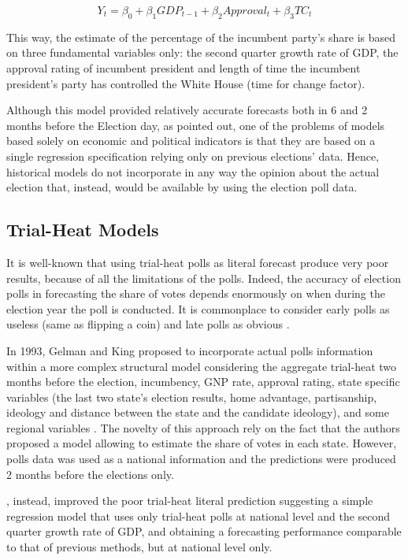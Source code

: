 \documentclass[
  12pt]{article}
\begin{document}
\[ Y_t = \beta_0 + \beta_1 GDP_{t-1} + \beta_2 Approval_t + \beta_3 TC_t \]

This way, the estimate of the percentage of the incumbent party's share
is based on three fundamental variables only: the second quarter growth
rate of GDP, the approval rating of incumbent president and length of
time the incumbent president's party has controlled the White House
(time for change factor).

Although this model provided relatively accurate forecasts both in 6 and
2 months before the Election day, as \citet{gel:kin:1993} pointed out,
one of the problems of models based solely on economic and political
indicators is that they are based on a single regression specification
relying only on previous elections' data. Hence, historical models do
not incorporate in any way the opinion about the actual election that,
instead, would be available by using the election poll data.

\hypertarget{trial-heat-models}{%
\subsection{Trial-Heat Models}\label{trial-heat-models}}

It is well-known that using trial-heat polls as literal forecast produce
very poor results, because of all the limitations of the polls. Indeed,
the accuracy of election polls in forecasting the share of votes depends
enormously on when during the election year the poll is conducted. It is
commonplace to consider early polls as useless (same as flipping a coin)
and late polls as obvious \citep{cam:1996}.

In 1993, Gelman and King proposed to incorporate actual polls
information within a more complex structural model considering the
aggregate trial-heat two months before the election, incumbency, GNP
rate, approval rating, state specific variables (the last two state's
election results, home advantage, partisanship, ideology and distance
between the state and the candidate ideology), and some regional
variables \citep{gel:kin:1993}. The novelty of this approach rely on the
fact that the authors proposed a model allowing to estimate the share of
votes in each state. However, polls data was used as a national
information and the predictions were produced 2 months before the
elections only.

\citet{cam:1996}, instead, improved the poor trial-heat literal
prediction suggesting a simple regression model that uses only
trial-heat polls at national level and the second quarter growth rate of
GDP, and obtaining a forecasting performance comparable to that of
previous methods, but at national level only.
\end{document}
